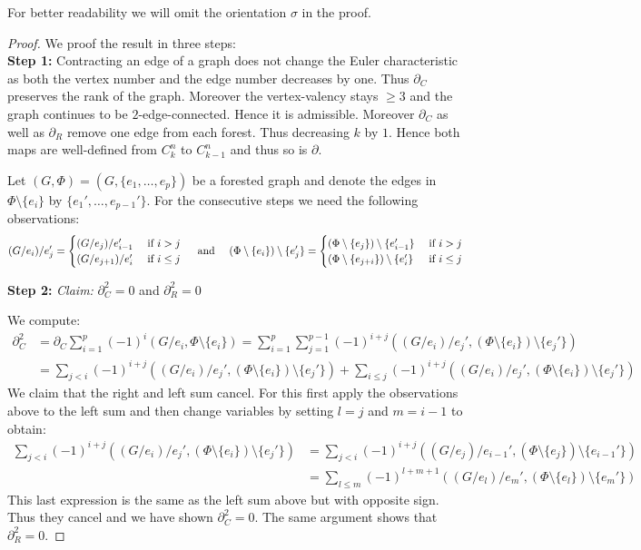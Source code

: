 For better readability we will omit the orientation $\sigma$ in the proof.
\begin{proof}


	We proof the result in three steps:\\
	\textbf{Step 1:} Contracting an edge of a graph does not change the Euler characteristic as both the vertex number and the edge number decreases by one.
	Thus $\partial_{C}$ preserves the rank of the graph. Moreover the vertex-valency stays $\geq 3$ and the graph continues to be $2$-edge-connected.
	Hence it is admissible.
	Moreover $\partial_{C}$ as well as $\partial_{R}$ remove one edge from each forest. Thus decreasing
	$k$ by $1$. Hence both maps are well-defined from $C^{n}_{k}$ to $C^{n}_{k-1}$ and thus so is $\partial$.

	Let $(G,\Phi) = (G, \{e_1,\ldots,e_{p}\})$ be a forested graph and denote the edges in $\Phi \setminus \{e_{i}\}$ by $\{e_1',\ldots,e_{p-1}'\}$.
	For the consecutive steps we need the following observations:
	\[
		(G / e_{i}) /  e_{j}' = \begin{cases}
			(G / e_{j}) / e_{i-1}' & \text{ if } i > j\\
			(G / e_{j+1}) / e_{i}' & \text{ if } i \leq j
		\end{cases}
		\qq{ and }
		(\Phi \setminus \{e_{i}\}) \setminus \{e_{j}'\}  = \begin{cases}	
			(\Phi \setminus \{e_{j}\}) \setminus \{e_{i-1}'\} & \text{ if } i > j\\
			(\Phi \setminus \{e_{j+i}\}) \setminus \{e_{i}'\} & \text{ if } i \leq j
		\end{cases}
	\]

	\textbf{Step 2:}\enskip
	\emph{Claim:}
		$\partial_{C}^2 = 0$ and $\partial_{R}^2 = 0$

	We compute:
	\begin{align*}
		\partial_{C}^2 &= \partial_{C} \sum_{i=1}^{p} (-1)^{i}(G / e_{i}, \Phi \setminus \{e_{i}\})
		=  \sum_{i=1}^{p} \sum_{j=1}^{p-1} (-1)^{i+j}((G / e_{i}) / e_{j}', (\Phi \setminus \{e_{i}\} ) \setminus \{e_{j}'\})  \\
					   &= \sum_{j < i} (-1)^{i+j} ((G / e_{i}) / e_{j}', (\Phi \setminus \{e_{i}\} ) \setminus \{e_{j}'\}) + \sum_{i \leq j} (-1)^{i+j}
					   ((G / e_{i}) / e_{j}', (\Phi \setminus \{e_{i}\} ) \setminus \{e_{j}'\}) 
	\end{align*}
	We claim that the right and left sum cancel. For this first apply the observations above to the left sum and then change variables by setting $l = j$ and  $m = i-1$ to obtain:
	\begin{align*}
		\sum_{j < i} (-1)^{i+j} ((G / e_{i}) / e_{j}', (\Phi \setminus \{e_{i}\}) \setminus \{e_{j}'\} ) &= 
		\sum_{j < i} (-1)^{i+j}((G / e_{j}) / e_{i-1}', (\Phi \setminus \{e_{j}\}) \setminus \{e_{i-1}'\} ) \\ 
		&= \sum_{l \leq m} (-1)^{l+m+1} ((G / e_{l}) / e_{m}', (\Phi \setminus \{e_{l}\}) \setminus \{e_{m}'\} ) 
	\end{align*}
	This last expression is the same as the left sum above but with opposite sign. Thus they cancel and we have shown $\partial_{C}^2 = 0$.
	The same argument shows that $\partial_{R}^2 = 0$.


\end{proof}
